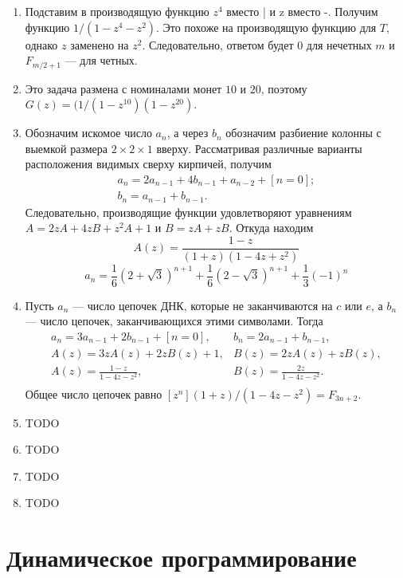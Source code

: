 \documentclass[14pt,openany]{book}
\begin{document}
\begin{enumerate}
\item Подставим в производящую функцию $z^4$ вместо | и z вместо -. Получим функцию $1/(1-z^4-z^2)$.
Это похоже на производящую функцию для $T$, однако $z$ заменено на $z^2$. Следовательно, 
ответом будет $0$ для нечетных $m$ и $F_{m/2+1}$ --- для четных.

\item Это задача размена с номиналами монет $10$ и $20$, поэтому $G(z)=(1/(1-z^{10})(1-z^{20})$.

\item Обозначим искомое число $a_n$, а через $b_n$ обозначим разбиение колонны с выемкой размера
      $2 \times 2 \times 1$ вверху. Рассматривая различные варианты расположения видимых сверху
      кирпичей, получим
$$
\begin{array}{ll}
a_n = 2a_{n-1} + 4b_{n-1} + a_{n-2} + [n=0]; \\
b_n = a_{n-1} + b_{n-1}.
\end{array}
$$
      Следовательно, производящие функции удовлетворяют уравнениям $A = 2zA+4zB+z^2A+1$ и
      $B = zA + zB$. Откуда находим $$A(z) = \frac{1-z}{(1+z)(1-4z+z^2)}$$
      $$a_n = \frac{1}{6}(2+\sqrt{3})^{n+1} + \frac{1}{6}(2-\sqrt{3})^{n+1} + \frac{1}{3}(-1)^n$$

\item Пусть $a_n$ --- число цепочек ДНК, которые не заканчиваются на $c$ или $e$, а $b_n$ --- число
      цепочек, заканчивающихся этими символами. Тогда
      $$
      \begin{array}{ll}
      a_n = 3a_{n-1}+2b_{n-1}+[n=0], & b_n = 2a_{n-1} + b_{n-1}, \\
      A(z) = 3zA(z) + 2zB(z) + 1,    & B(z) = 2zA(z) + zB(z), \\
      A(z) = \frac{1-z}{1-4z-z^2},   & B(z) = \frac{2z}{1-4z-z^2}. \\
      \end{array}
      $$
      Общее число цепочек равно $[z^n](1+z)/(1-4z-z^2) = F_{3n+2}$.

\item TODO

\item TODO

\item TODO

\item TODO

\end{enumerate}

\chapter{Динамическое программирование}
\end{document}
